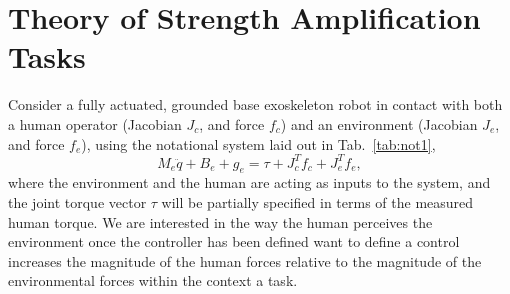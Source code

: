 


















\section{Theory of Strength Amplification Tasks}\label{sec:theory}
%



Consider a fully actuated, grounded base exoskeleton robot in contact with both a human operator (Jacobian $J_c$, and force $f_c$) and an environment (Jacobian $J_e$, and force $f_e$), using the notational system laid out in Tab.~\ref{tab:not1},
\begin{equation}
M_e \ddot q + B_e + g_e = \tau + J_c^T f_c + J_e^T f_e,
\end{equation}
where the environment and the human are acting as inputs to the system, and the joint torque vector $\tau$ will be partially specified in terms of the measured human torque. We are interested in the way the human perceives the environment once the controller has been defined want to define a control  increases the magnitude of the human forces relative to the magnitude of the environmental forces within the context  a task.

